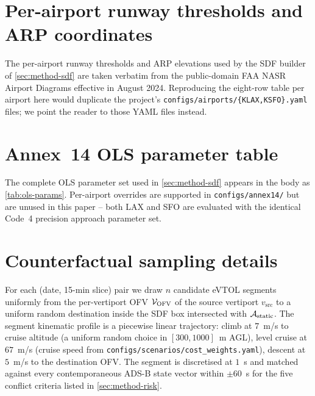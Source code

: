 \section{Per-airport runway thresholds and ARP coordinates}
\label{sec:appendix-airports}

The per-airport runway thresholds and ARP elevations used by the SDF
builder of \cref{sec:method-sdf} are taken verbatim from the
public-domain FAA NASR Airport Diagrams effective in August 2024.
Reproducing the eight-row table per airport here would duplicate the
project's \texttt{configs/airports/\{KLAX,KSFO\}.yaml} files; we point
the reader to those YAML files instead.


\section{Annex~14 OLS parameter table}
\label{sec:appendix-ols}

The complete OLS parameter set used in \cref{sec:method-sdf} appears in the
body as \cref{tab:ols-params}. Per-airport overrides are supported in
\texttt{configs/annex14/} but are unused in this paper -- both LAX and SFO
are evaluated with the identical Code~4 precision approach parameter set.

\section{Counterfactual sampling details}
\label{sec:appendix-cf}

For each (date, 15-min slice) pair we draw $n$ candidate eVTOL segments
uniformly from the per-vertiport OFV $\mathcal{V}_{\mathrm{OFV}}$ of the source vertiport
$v_{\mathrm{src}}$ to a uniform random destination inside the SDF box
intersected with $\mathcal{A}_{\mathrm{static}}$. The segment kinematic profile is a piecewise
linear trajectory: climb at $7$~m/s to cruise altitude (a uniform random
choice in $[300, 1000]$~m AGL), level cruise at $67$~m/s (cruise speed
from \texttt{configs/scenarios/cost\_weights.yaml}), descent at $5$~m/s to
the destination OFV. The segment is discretised at $1$~s and matched
against every contemporaneous ADS-B state vector within
$\pm 60$~s for the five conflict criteria listed in
\cref{sec:method-risk}.

